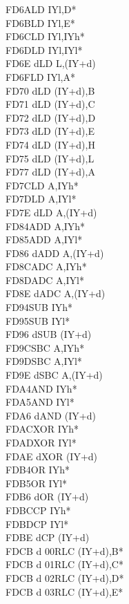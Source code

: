 \documentclass[oneside,a4paper]{book}
\begin{document}
\begin{multicols}{3}
{\begin{tabbing}
FD6A\>LD IYl,D*\\
FD6B\>LD IYl,E*\\
FD6C\>LD IYl,IYh*\\
FD6D\>LD IYl,IYl*\\
FD6E d\>LD L,(IY+d)\\
FD6F\>LD IYl,A*\\
FD70 d\>LD (IY+d),B\\
FD71 d\>LD (IY+d),C\\
FD72 d\>LD (IY+d),D\\
FD73 d\>LD (IY+d),E\\
FD74 d\>LD (IY+d),H\\
FD75 d\>LD (IY+d),L\\
FD77 d\>LD (IY+d),A\\
FD7C\>LD A,IYh*\\
FD7D\>LD A,IYl*\\
FD7E d\>LD A,(IY+d)\\
FD84\>ADD A,IYh*\\
FD85\>ADD A,IYl*\\
FD86 d\>ADD A,(IY+d)\\
FD8C\>ADC A,IYh*\\
FD8D\>ADC A,IYl*\\
FD8E d\>ADC A,(IY+d)\\
FD94\>SUB IYh*\\
FD95\>SUB IYl*\\
FD96 d\>SUB (IY+d)\\
FD9C\>SBC A,IYh*\\
FD9D\>SBC A,IYl*\\
FD9E d\>SBC A,(IY+d)\\
FDA4\>AND IYh*\\
FDA5\>AND IYl*\\
FDA6 d\>AND (IY+d)\\
FDAC\>XOR IYh*\\
FDAD\>XOR IYl*\\
FDAE d\>XOR (IY+d)\\
FDB4\>OR IYh*\\
FDB5\>OR IYl*\\
FDB6 d\>OR (IY+d)\\
FDBC\>CP IYh*\\
FDBD\>CP IYl*\\
FDBE d\>CP (IY+d)\\
FDCB d 00\>RLC (IY+d),B*\\
FDCB d 01\>RLC (IY+d),C*\\
FDCB d 02\>RLC (IY+d),D*\\
FDCB d 03\>RLC (IY+d),E*\\

\end{tabbing}}
\end{multicols}
\end{document}

